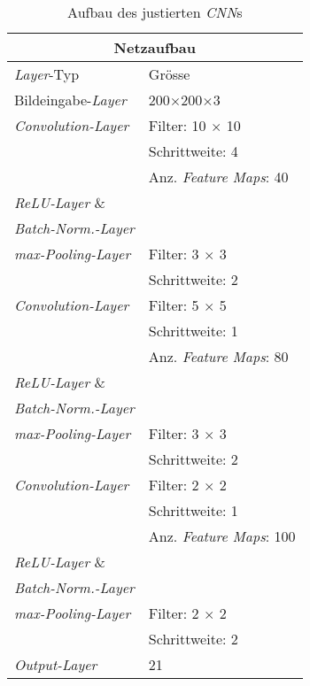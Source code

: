 \begin{table}[!htb]
	\def\arraystretch{1.4}
	\centering
	\begin{subtable}[t]{.55\linewidth}
		\begin{tabular}[t]{l | l }
			\multicolumn{2}{c}{\textbf{Netzaufbau}}\\
			\hline
			\textit{Layer}-Typ & Grösse\\
			\hline
			\hline
			Bildeingabe-\textit{Layer} & 200$\times$200$\times$3\\
			\hline
			\textit{Convolution-Layer}& Filter: 10 $\times$ 10\\
			& Schrittweite: 4\\
			& Anz. \textit{Feature Maps}: 40\\
			\hline
			\textit{ReLU-Layer} \& & \\
			\textit{Batch-Norm.-Layer} & \\
			\hline
			\textit{max-Pooling-Layer}& Filter: 3 $\times$ 3\\
			& Schrittweite: 2\\
			
			\hline
			\textit{Convolution-Layer}& Filter: 5 $\times$ 5\\
			& Schrittweite: 1\\
			& Anz. \textit{Feature Maps}: 80\\
			\hline
			\textit{ReLU-Layer} \& & \\
			\textit{Batch-Norm.-Layer} & \\
			\hline
			\textit{max-Pooling-Layer}& Filter: 3 $\times$ 3\\
			& Schrittweite: 2\\
			\hline
			\textit{Convolution-Layer}& Filter: 2 $\times$ 2\\
			& Schrittweite: 1\\
			& Anz. \textit{Feature Maps}: 100\\
			\hline
			\textit{ReLU-Layer} \& & \\
			\textit{Batch-Norm.-Layer} & \\
			\hline
			\textit{max-Pooling-Layer}& Filter: 2 $\times$ 2\\
			& Schrittweite: 2\\
			\hline
			\textit{Output-Layer}   & 21\\
		\end{tabular}
	\end{subtable}%
	\caption{Aufbau des justierten \textit{CNN}s}
	\label{table:final_cnn_structure}
\end{table}

